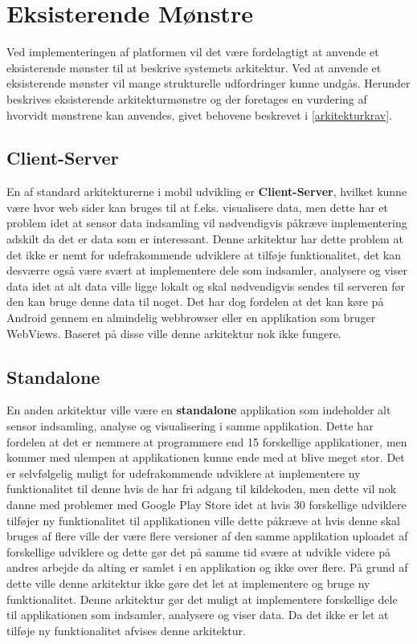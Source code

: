 \section{Eksisterende Mønstre}
Ved implementeringen af platformen vil det være fordelagtigt at anvende et eksisterende mønster til at beskrive systemets arkitektur.
Ved at anvende et eksisterende mønster vil mange strukturelle udfordringer kunne undgås.
Herunder beskrives eksisterende arkitekturmønstre og der foretages en vurdering af hvorvidt mønstrene kan anvendes, givet behovene beskrevet i \cref{arkitekturkrav}.

\subsection{Client-Server}
En af standard arkitekturerne i mobil udvikling er \textbf{Client-Server}, hvilket kunne være hvor web sider kan bruges til at f.eks. visualisere data, men dette har et problem idet at sensor data indsamling vil nødvendigvis påkræve implementering adskilt da det er data som er interessant.
Denne arkitektur har dette problem at det ikke er nemt for udefrakommende udviklere at tilføje funktionalitet, det kan desværre også være svært at implementere dele som indsamler, analysere og viser data idet at alt data ville ligge lokalt og skal nødvendigvis sendes til serveren før den kan bruge denne data til noget. 
Det har dog fordelen at det kan køre på Android gennem en almindelig webbrowser eller en applikation som bruger WebViews.
Baseret på disse ville denne arkitektur nok ikke fungere.
\subsection{Standalone}
En anden arkitektur ville være en \textbf{standalone} applikation som indeholder alt sensor indsamling, analyse og visualisering i samme applikation.
Dette har fordelen at det er nemmere at programmere end 15 forskellige applikationer, men kommer med ulempen at applikationen kunne ende med at blive meget stor.
Det er selvfølgelig muligt for udefrakommende udviklere at implementere ny funktionalitet til denne hvis de har fri adgang til kildekoden, men dette vil nok danne med problemer med Google Play Store idet at hvis 30 forskellige udviklere tilføjer ny funktionalitet til applikationen ville dette påkræve at hvis denne skal bruges af flere ville der være flere versioner af den samme applikation uploadet af forskellige udviklere og dette gør det på samme tid svære at udvikle videre på andres arbejde da alting er samlet i en applikation og ikke over flere.
På grund af dette ville denne arkitektur ikke gøre det let at implementere og bruge ny funktionalitet.
Denne arkitektur gør det muligt at implementere forskellige dele til applikationen som indsamler, analysere og viser data.
Da det ikke er let at tilføje ny funktionalitet afvises denne arkitektur. 

